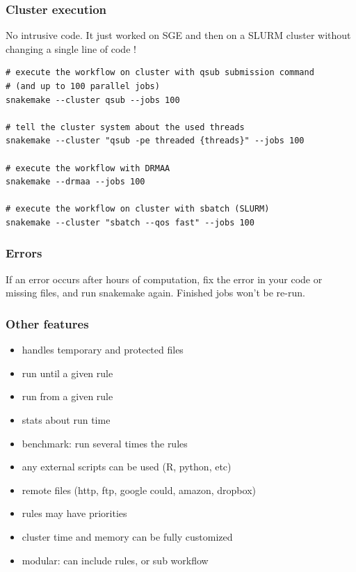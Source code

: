 \documentclass{beamer}
\begin{document}
\begin{frame}[fragile]
\frametitle{Cluster execution}

No intrusive code. It just worked on SGE and then on a SLURM cluster 
without changing a single line of code !

\begin{lstlisting}
# execute the workflow on cluster with qsub submission command
# (and up to 100 parallel jobs)
snakemake --cluster qsub --jobs 100

# tell the cluster system about the used threads
snakemake --cluster "qsub -pe threaded {threads}" --jobs 100

# execute the workflow with DRMAA
snakemake --drmaa --jobs 100

# execute the workflow on cluster with sbatch (SLURM)
snakemake --cluster "sbatch --qos fast" --jobs 100

\end{lstlisting}
\end{frame}


\begin{frame}
 \frametitle{Errors}
 
 If an error occurs after hours of computation, fix the error in your code or missing files, 
 and run snakemake again. Finished jobs won't be re-run. 
 
\end{frame}


\begin{frame}
\frametitle{Other features}

\begin{itemize}
\item handles temporary and protected files
\item run until a given rule
\item run from a given rule
\item stats about run time
\item benchmark: run several times the rules
\item any external scripts can be used (R, python, etc)
\item remote files (http, ftp, google could, amazon, dropbox)
\item rules may have priorities
\item cluster time and memory can be fully customized
\item modular: can include rules, or sub workflow
\end{itemize}

\end{frame}
\end{document}
